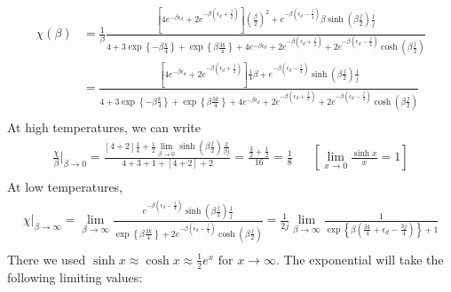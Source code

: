 \documentclass[12pt,twoside]{article}
\numberwithin{equation}{section}
\begin{document}
\begin{equation}\begin{aligned}
	\chi(\beta) &= \frac{1}{\beta}\frac{\left[4e^{-\beta \epsilon_d} + 2e^{-\beta \left(\epsilon_d + \frac{j}{2}\right)}\right] \left(\frac{\beta}{2}\right)^2 + e^{-\beta\left(\epsilon_d - \frac{j}{4}\right)}\beta \sinh \left(\beta \frac{j}{2} \right) \frac{1}{j}}{4 + 3\exp\left\{-\beta \frac{k}{4}\right\} + \exp\left\{\beta \frac{3k}{4}\right\} + 4e^{-\beta \epsilon_d} + 2e^{-\beta \left(\epsilon_d + \frac{j}{2}\right)} + 2e^{-\beta\left(\epsilon_d - \frac{j}{4}\right)}\cosh \left(\beta \frac{j}{2}\right)}\\
		    &=\frac{\left[4e^{-\beta \epsilon_d} + 2e^{-\beta \left(\epsilon_d + \frac{j}{2}\right)}\right] \frac{1}{4}\beta + e^{-\beta\left(\epsilon_d - \frac{j}{4}\right)} \sinh \left(\beta \frac{j}{2} \right) \frac{1}{j}}{4 + 3\exp\left\{-\beta \frac{k}{4}\right\} + \exp\left\{\beta \frac{3k}{4}\right\} + 4e^{-\beta \epsilon_d} + 2e^{-\beta \left(\epsilon_d + \frac{j}{2}\right)} + 2e^{-\beta\left(\epsilon_d - \frac{j}{4}\right)}\cosh \left(\beta \frac{j}{2}\right)}\\
\end{aligned}\end{equation}
At high temperatures, we can write
\begin{equation}\begin{aligned}
	\frac{\chi}{\beta}\vert_{\beta \to 0} = \frac{\left[4 + 2\right] \frac{1}{4} + \frac{1}{2}\lim_{\beta \to 0}\sinh \left(\beta \frac{j}{2} \right) \frac{2}{\beta j}}{4 + 3 + 1 + \left[4 + 2\right] + 2} = \frac{\frac{3}{2} + \frac{1}{2}}{16} = \frac{1}{8} && \left[\lim_{x \to 0} \frac{\sinh x}{x} = 1\right] \\
\end{aligned}\end{equation}
At low temperatures,
\begin{equation}\begin{aligned}
	\chi\vert_{\beta \to \infty} = \lim_{\beta \to \infty} \frac{e^{-\beta\left(\epsilon_d - \frac{j}{4}\right)} \sinh \left(\beta \frac{j}{2} \right) \frac{1}{j}}{\exp\left\{\beta \frac{3k}{4}\right\} + 2e^{-\beta\left(\epsilon_d - \frac{j}{4}\right)}\cosh \left(\beta \frac{j}{2}\right)} =  \frac{1}{2j}\lim_{\beta \to \infty} \frac{1}{\exp\left\{\beta \left(\frac{3k}{4} + \epsilon_d - \frac{3j}{4}\right)\right\} + 1} \\
\end{aligned}\end{equation}
There we used \(\sinh x \approx \cosh x \approx \frac{1}{2}e^x \text{ for }x\to \infty\). The exponential will take the following limiting values:
\end{document}

